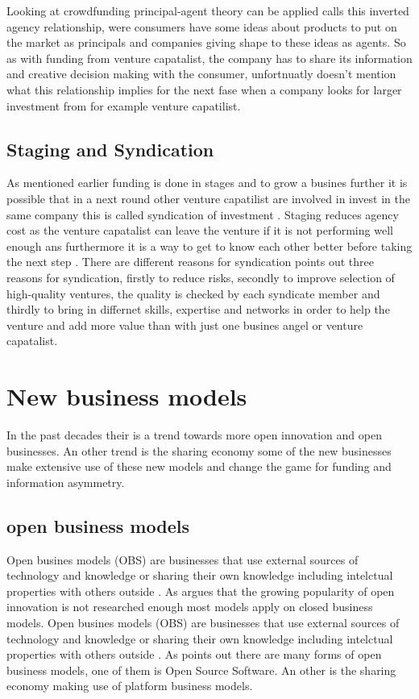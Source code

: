 \documentclass[a4paper, 11pt]{article}
\begin{document}
Looking at crowdfunding principal-agent theory can be applied \citep{chaney} calls this inverted agency relationship, were consumers have some ideas about products to put on the market as principals and companies giving shape to these ideas as agents. So as with funding from venture capatalist, the company has to share its information and creative decision making with the consumer, \citep{chaney} unfortnuatly doesn't mention what this relationship implies for the next fase when a company looks for larger investment from for example venture capatilist.


\subsection{Staging and Syndication}
As mentioned earlier funding is done in stages and to grow a busines further it is possible that in a next round other venture capatilist are involved in invest in the same company this is called syndication of investment \citep{casson2008oxford}. Staging reduces agency cost as the venture capatalist can leave the venture if it is not performing well enough ans furthermore it is a way to get to know each other better before taking the next step \citep{colombo2016open}. There are different reasons for syndication  \cite{colombo2016open} points out three reasons for syndication, firstly to reduce risks, secondly to improve selection of high-quality ventures, the quality is checked by each syndicate member and thirdly to bring in differnet skills, expertise and networks in order to help the venture and add more value than with just one busines angel or venture capatalist.


\section{New business models}
In the past decades their is a trend towards more open innovation and open businesses. An other trend is the sharing economy some of the new businesses make extensive use of these new models and change the game for funding and information asymmetry.

\subsection{open business models}

Open busines models (OBS) are businesses that use external sources of technology and knowledge or sharing their own knowledge including intelctual properties with others outside \citep{chesbrough2007companies}. 
As \cite{colombo2016open} argues that the growing popularity of open innovation is not researched enough most models apply on closed business models. Open busines models (OBS) are businesses that use external sources of technology and knowledge or sharing their own knowledge including intelctual properties with others outside \citep{chesbrough2007companies}. As \cite{colombo2016open} points out there are many forms of open business models, one of them is Open Source Software. An other is the sharing economy making use of platform business models.
\end{document}
